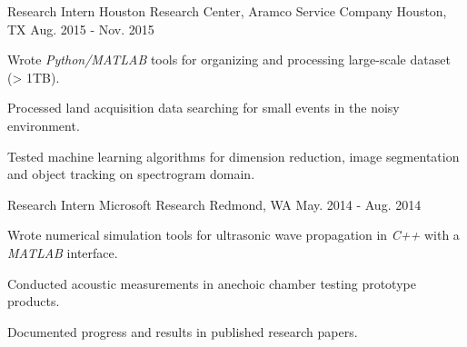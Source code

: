 \begin{cventries}
  \cventry
    {Research Intern} %
    {Houston Research Center, Aramco Service Company} %
    {Houston, TX} %
    {Aug. 2015 - Nov. 2015} %
    {
      \begin{cvitems} %
        \item {Wrote \textit{Python/MATLAB} tools for organizing and processing large-scale dataset (> 1TB).}
        \item {Processed land acquisition data searching for small events in the noisy environment.}
        \item {Tested machine learning algorithms for dimension reduction, image segmentation and object tracking on spectrogram domain.}
      \end{cvitems}
    }

  \cventry
    {Research Intern} %
    {Microsoft Research} %
    {Redmond, WA} %
    {May. 2014 - Aug. 2014} %
    {
      \begin{cvitems} %
        \item {Wrote numerical simulation tools for ultrasonic wave propagation in \textit{C++} with a \textit{MATLAB} interface.}
        \item {Conducted acoustic measurements in anechoic chamber testing prototype products.}
        \item {Documented progress and results in published research papers.}
      \end{cvitems}
    }


\end{cventries}
